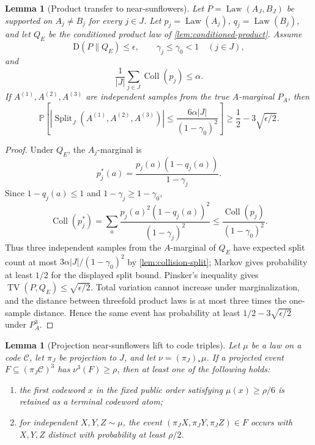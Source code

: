 \documentclass[11pt]{article}
\newcommand{\Cref}[1]{\ref{#1}}
\newtheorem{lemma}[theorem]{Lemma}
\theoremstyle{remark}
\newcommand{\C}{\mathcal C}
\newcommand{\Prob}{\mathbb P}
\newcommand{\KL}{\mathrm D}
\newcommand{\Split}{\operatorname{Split}}
\newcommand{\Law}{\operatorname{Law}}
\newcommand{\Coll}{\operatorname{Coll}}
\newcommand{\TV}{\operatorname{TV}}
\begin{document}
\begin{lemma}[Product transfer to near-sunflowers]\label{lem:product-near-sunflower}
Let $P=\Law(A_J,B_J)$ be supported on $A_j\ne B_j$ for every $j\in J$.  Let $p_j=\Law(A_j)$, $q_j=\Law(B_j)$, and let $Q_E$ be the conditioned product law of \Cref{lem:conditioned-product}.  Assume
\[
        \KL(P\|Q_E)\le \epsilon,
        \qquad
        \gamma_j\le\gamma_0<1\quad(j\in J),
\]
and
\[
        \frac{1}{|J|}\sum_{j\in J}\Coll(p_j)\le\alpha.
\]
If $A^{(1)},A^{(2)},A^{(3)}$ are independent samples from the true $A$-marginal $P_A$, then
\[
        \Prob\left[|\Split_J(A^{(1)},A^{(2)},A^{(3)})|
        \le \frac{6\alpha |J|}{(1-\gamma_0)^2}\right]
        \ge \frac{1}{2}-3\sqrt{\epsilon/2}.
\]
\end{lemma}

\begin{proof}
Under $Q_E$, the $A_j$-marginal is
\[
        p_j^*(a)=\frac{p_j(a)(1-q_j(a))}{1-\gamma_j}.
\]
Since $1-q_j(a)\le1$ and $1-\gamma_j\ge1-\gamma_0$,
\[
        \Coll(p_j^*)=\sum_a \frac{p_j(a)^2(1-q_j(a))^2}{(1-\gamma_j)^2}
        \le \frac{\Coll(p_j)}{(1-\gamma_0)^2}.
\]
Thus three independent samples from the $A$-marginal of $Q_E$ have expected split count at most $3\alpha |J|/(1-\gamma_0)^2$ by \Cref{lem:collision-split}; Markov gives probability at least $1/2$ for the displayed split bound.  Pinsker's inequality gives $\TV(P,Q_E)\le\sqrt{\epsilon/2}$.  Total variation cannot increase under marginalization, and the distance between threefold product laws is at most three times the one-sample distance.  Hence the same event has probability at least $1/2-3\sqrt{\epsilon/2}$ under $P_A^3$.
\end{proof}

\begin{lemma}[Projection near-sunflowers lift to code triples]\label{lem:projection-lift}
Let $\mu$ be a law on a code $\C$, let $\pi_J$ be projection to $J$, and let $\nu=(\pi_J)_*\mu$.  If a projected event $F\subseteq(\pi_J\C)^3$ has $\nu^3(F)\ge\rho$, then at least one of the following holds:
\begin{enumerate}[label=\textup{(\roman*)}]
\item the first codeword $x$ in the fixed public order satisfying $\mu(x)\ge\rho/6$ is retained as a terminal codeword atom;
\item for independent $X,Y,Z\sim\mu$, the event $(\pi_JX,\pi_JY,\pi_JZ)\in F$ occurs with $X,Y,Z$ distinct with probability at least $\rho/2$.
\end{enumerate}
\end{lemma}
\end{document}
